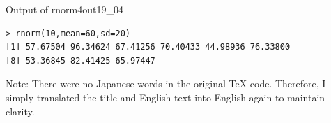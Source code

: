 \begin{Rscreen}{Output of rnorm4}{out19_04}
	\begin{verbatim}
> rnorm(10,mean=60,sd=20)
[1] 57.67504 96.34624 67.41256 70.40433 44.98936 76.33800
[8] 53.36845 82.41425 65.97447
\end{verbatim}
\end{Rscreen}

Note: There were no Japanese words in the original TeX code. Therefore, I simply translated the title and English text into English again to maintain clarity.
